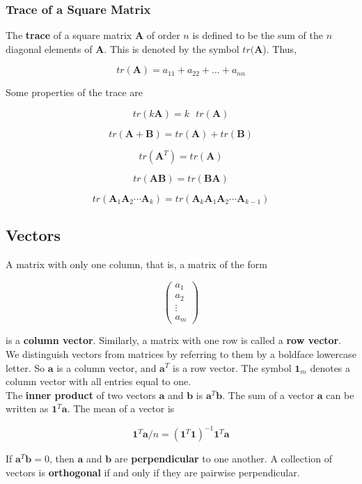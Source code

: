 \documentclass[11pt]{article}
\theoremstyle{definition}
\begin{document}
\subsubsection{Trace of a Square Matrix}
The \textbf{trace} of a square matrix $\mathbf{A}$ of order $n$ is defined to be the sum of the $n$ diagonal elements of $\mathbf{A}$.  This is denoted by the symbol $tr(\mathbf{A}$).  Thus,

\[tr(\mathbf{A}) = a_{11} + a_{22} + \hdots + a_{nn}\]

Some properties of the trace are

\[tr(k\mathbf{A}) = k\text{ }tr(\mathbf{A})\]

\[tr(\mathbf{A} + \mathbf{B}) = tr(\mathbf{A})+ tr(\mathbf{B})\]

\[tr(\mathbf{A}^T) = tr(\mathbf{A})\]

\[tr(\mathbf{AB}) = tr(\mathbf{BA})\]

\[tr(\mathbf{A}_1\mathbf{A}_2\cdots\mathbf{A}_k) = tr(\mathbf{A}_k\mathbf{A}_1\mathbf{A}_2\cdots \mathbf{A}_{k-1})\]

\subsection{Vectors}
A matrix with only one column, that is, a matrix of the form

\[\begin{pmatrix}
    a_1\\
    a_2\\
    \vdots  \\
    a_m
\end{pmatrix}
\]

is a \textbf{column vector}.  Similarly, a matrix with one row is called a \textbf{row vector}.  We distinguish vectors from matrices by referring to them by a boldface lowercase letter.  So $\mathbf{a}$ is a column vector, and $\mathbf{a}^T$ is a row vector.  The symbol $\mathbf{1}_m$ denotes a column vector with all entries equal to one.\\

The \textbf{inner product} of two vectors $\mathbf{a}$ and $\mathbf{b}$ is $\mathbf{a}^T\mathbf{b}$.  The sum of a vector $\mathbf{a}$ can be written as $\mathbf{1}^T\mathbf{a}$.  The mean of a vector is

\[\mathbf{1}^T\mathbf{a}/n = (\mathbf{1}^T\mathbf{1})^{-1}\mathbf{1}^T\mathbf{a}\]

If $\mathbf{a}^T\mathbf{b} = 0$, then $\mathbf{a}$ and $\mathbf{b}$ are \textbf{perpendicular} to one another.  A collection of vectors is \textbf{orthogonal} if and only if they are pairwise perpendicular.\\
\end{document}

